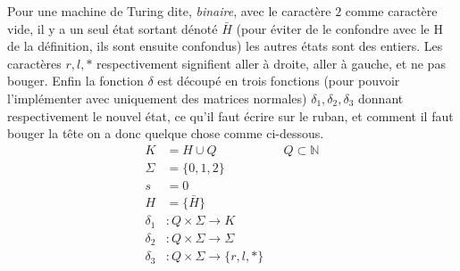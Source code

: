 \documentclass[colorlinks]{article}
\begin{document}
Pour une machine de Turing dite, \textit{binaire}, avec le caractère $2$ comme caractère vide, 
il y a un seul état sortant dénoté $\bar{H}$ (pour éviter de le confondre avec le H de la définition, ils sont ensuite confondus) 
les autres états sont des entiers. 
Les caractères $r,l,*$ respectivement signifient aller à droite, aller à gauche, et ne pas bouger.
Enfin la fonction $\delta$ est découpé en trois fonctions (pour pouvoir l'implémenter 
avec uniquement des matrices normales) $\delta_1,\delta_2,\delta_3$ donnant respectivement 
le nouvel état, ce qu'il faut écrire sur le ruban, et comment il faut bouger la tête
 on a donc quelque chose comme ci-dessous.
\begin{align*}
    K &= H \cup Q && Q \subset \mathbb{N} \\
    \Sigma &= \{0,1,2\} \\ 
    s &= 0 \\ 
    H &= \{\bar{H}\} \\ 
    \delta_1 &: Q \times \Sigma \to K \\ 
    \delta_2 &: Q \times \Sigma \to \Sigma \\ 
    \delta_3 &: Q \times \Sigma \to \{r,l,*\}
\end{align*}

    
    
\end{document}
